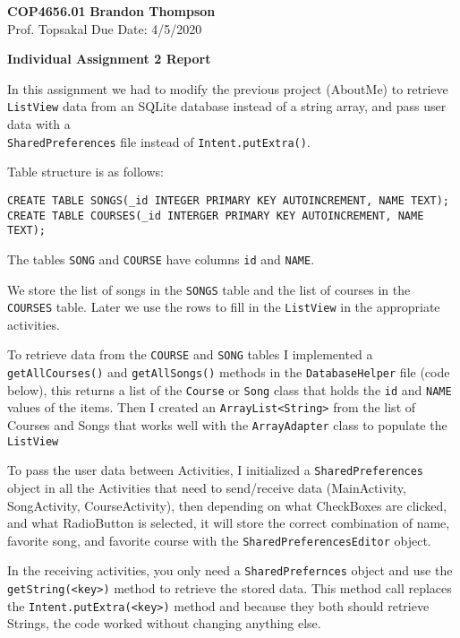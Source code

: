 \documentclass[12pt]{article}
\begin{document}
\noindent
\textbf{COP4656.01} \hfill \textbf{Brandon Thompson} \\
\normalsize Prof. Topsakal \hfill Due Date: 4/5/2020 \\

\begin{center}
\textbf{Individual Assignment 2 Report}
\end{center}
In this assignment we had to modify the previous project (AboutMe) to retrieve \verb|ListView| data from an SQLite database instead of a string array, and pass user data with a \\ \verb|SharedPreferences| file instead of \verb|Intent.putExtra()|.

Table structure is as follows:\\
\begin{center}
	\verb|CREATE TABLE SONGS(_id INTEGER PRIMARY KEY AUTOINCREMENT, NAME TEXT);|
	\verb|CREATE TABLE COURSES(_id INTERGER PRIMARY KEY AUTOINCREMENT, NAME TEXT);|
\end{center}
The tables \verb|SONG| and \verb|COURSE| have columns \verb|id| and \verb|NAME|.

We store the list of songs in the \verb|SONGS| table and the list of courses in the \verb|COURSES| table. Later we use the rows to fill in the \verb|ListView| in the appropriate activities.

To retrieve data from the \verb|COURSE| and \verb|SONG| tables I implemented a \verb|getAllCourses()| and \verb|getAllSongs()| methods in the \verb|DatabaseHelper| file (code below), this returns a list of the \verb|Course| or \verb|Song| class that holds the \verb|id| and \verb|NAME| values of the items. Then I created an \verb|ArrayList<String>| from the list of Courses and Songs that works well with the \verb|ArrayAdapter| class to populate the \verb|ListView|

To pass the user data between Activities, I initialized a \verb|SharedPreferences| object in all the Activities that need to send/receive data (MainActivity, SongActivity, CourseActivity), then depending on what CheckBoxes are clicked, and what RadioButton is selected, it will store the correct combination of name, favorite song, and favorite course with the \verb|SharedPreferencesEditor| object.

In the receiving activities, you only need a \verb|SharedPrefernces| object and use the\\ \verb|getString(<key>)| method to retrieve the stored data. This method call replaces the \verb|Intent.putExtra(<key>)| method and because they both should retrieve Strings, the code worked without changing anything else.
\end{document}
